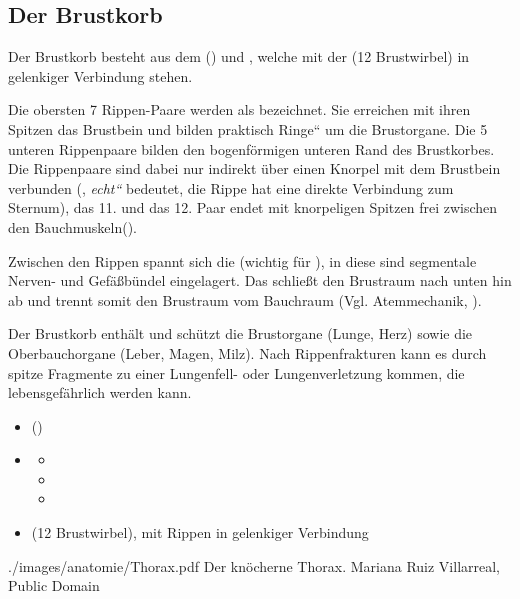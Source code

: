 \subsection{Der Brustkorb}
\label{topic:brustkorb-skelett}
\label{topic:thorax}


{%
Der  Brustkorb besteht  aus dem 
 () und , welche  mit der
 (12 Brust\-wirbel) in gelenkiger
Verbindung stehen.

Die obersten 7 Rippen-Paare werden als
{\quotedblbase}
bezeichnet. Sie erreichen mit ihren Spitzen das Brustbein
und bilden praktisch {\quotedblbase}Ringe{\textquotedblleft}
um die Brustorgane. Die 5 unteren Rippenpaare bilden den
bogenförmigen unteren Rand des Brustkorbes. Die Rippenpaare
 sind dabei nur indirekt über einen Knorpel
mit dem Brustbein verbunden ({\quotedblbase},
\emph{{\quotedblbase}echt{\textquotedblleft}} bedeutet, die
Rippe hat eine direkte Verbindung zum Sternum), das 11. und
das 12. Paar endet mit knorpeligen Spitzen frei zwischen den
Bauchmuskeln({\quotedblbase}).

Zwischen den
Rippen spannt sich die
(wichtig für ), in diese sind segmentale
Nerven- und Gefäßbündel eingelagert. Das 
 schließt den Brustraum nach unten hin ab
und trennt somit den Brustraum vom Bauchraum (Vgl.
Atemmechanik, ).

Der Brustkorb enthält und schützt die Brust\-organe (Lunge,
Herz) sowie die Oberbauchorgane (Leber, Magen, Milz). 
Nach Rippenfrakturen kann es durch spitze
Fragmente zu einer Lungenfell- oder Lungenverletzung kommen,
die lebensgefährlich werden kann.

}
{
\begin{itemize}
    \item {} ()
    \item {}
    \begin{itemize}
        \item {}
        \item {}
        \item {}
    \end{itemize}
    \item {} (12 Brust\-wirbel), mit
    Rippen in gelenkiger Verbindung
\end{itemize}
}
{./images/anatomie/Thorax.pdf}
{Der knöcherne Thorax.}
{Mariana Ruiz Villarreal, Public Domain}



